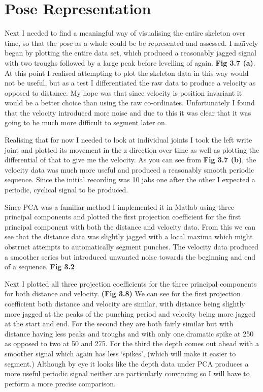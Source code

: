 \section{Pose Representation}
Next I needed to find a meaningful way of visualising the entire skeleton over time, so that the pose as a whole could be be represented and assessed. I na{\"i}ively began by plotting the entire data set, which produced a reasonably jagged signal with two troughs followed by a large peak before levelling of again. {\bf Fig 3.7 (a)}. At this point I realised attempting to plot the skeleton data in this way would not be useful, but as a test I differentiated the raw data to produce a velocity as opposed to distance. My hope was that since velocity is position invariant it would be a better choice than using the raw co-ordinates. Unfortunately I found that the velocity introduced more noise and due to this it was clear that it was going to be much more difficult to segment later on.

Realising that for now I needed to look at individual joints I took the left write joint and plotted its movement in the z direction over time as well as plotting the differential of that to give me the velocity. As you can see from {\bf Fig 3.7 (b)}, the velocity data was much more useful and produced a reasonably smooth periodic sequence. Since the initial recording was 10 jabs one after the other I expected a periodic, cyclical signal to be produced.

Since PCA was a familiar method I implemented it in Matlab using three principal components and plotted the first projection coefficient for the first principal component with both the distance and velocity data. From this we can see that the distance data was slightly jagged with a local maxima which might obstruct attempts to automatically segment punches. The velocity data produced a smoother series but introduced unwanted noise towards the beginning and end of a sequence. {\bf Fig 3.2}

Next I plotted all three projection coefficients for the three principal components for both distance and velocity. {\bf (Fig 3.8)} We can see for the first projection coefficient both distance and velocity are similar, with distance being slightly more jagged at the peaks of the punching period and velocity being more jagged at the start and end.
For the second they are both fairly similar but with distance having less peaks and troughs and with only one dramatic spike at 250 as opposed to two at 50 and 275.
For the third the depth comes out ahead with a smoother signal which again has less `spikes', (which will make it easier to segment.) Although by eye it looks like the depth data under PCA produces a more useful periodic signal neither are particularly convincing so I will have to perform a more precise comparison.

